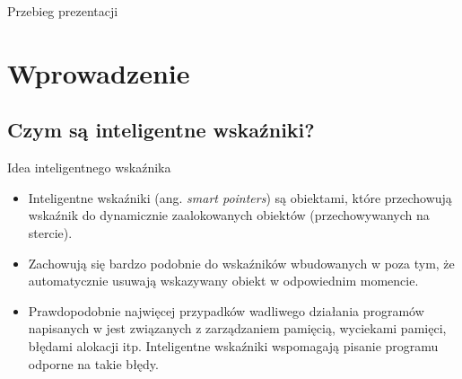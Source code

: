 
\usepackage{relsize}
\usepackage{lipsum}
\usepackage{alltt}

\def\ifmonospace{\ifdim\fontdimen3\font=0pt }

\def\C++{%
  \ifmonospace%
  C++%
  \else%
  C\kern-.1667em\raise.30ex\hbox{\smaller{++}}%
  \fi%
  \spacefactor1000 }

\def\Csharp{%
  \ifmonospace%
  C\#%
  \else%
  C\kern-.1667em\raise.30ex\hbox{\smaller{\#}}%
  \fi%
  \spacefactor1000 }



\frame{\titlepage}

\begin{frame}{Przebieg prezentacji}
  \tableofcontents
\end{frame}



\section{Wprowadzenie}

\subsection{Czym są inteligentne wskaźniki?}

\begin{frame}{Idea inteligentnego wskaźnika}
  \begin{itemize}
  \item Inteligentne wskaźniki (ang. \emph{smart pointers}) są obiektami,
    które przechowują wskaźnik do dynamicznie zaalokowanych obiektów
    (przechowywanych na stercie). \pause
  \item Zachowują się bardzo podobnie do
    wskaźników wbudowanych w \C++ poza tym, że automatycznie usuwają wskazywany
    obiekt w odpowiednim momencie. \pause
  \item Prawdopodobnie najwięcej przypadków wadliwego działania
    programów napisanych w \C++ jest związanych z zarządzaniem
    pamięcią, wyciekami pamięci, błędami alokacji itp.
    Inteligentne wskaźniki wspomagają pisanie 
    programu odporne na takie błędy.
  \end{itemize}
\end{frame}


